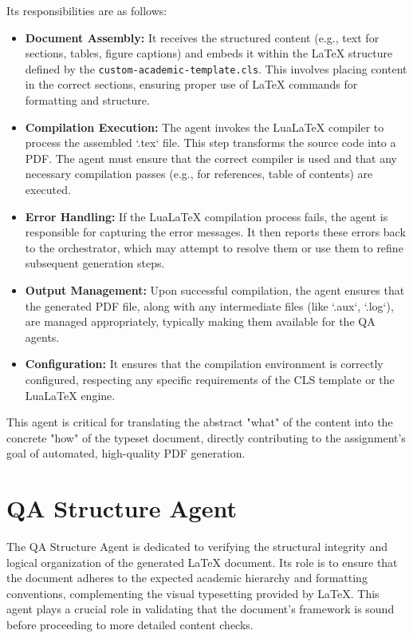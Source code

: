 \documentclass{custom-academic-template}
\begin{document}
Its responsibilities are as follows:
\begin{itemize}
    \item 	\textbf{Document Assembly:} It receives the structured content (e.g., text for sections, tables, figure captions) and embeds it within the LaTeX structure defined by the 	\texttt{custom-academic-template.cls}. This involves placing content in the correct sections, ensuring proper use of LaTeX commands for formatting and structure.
    \item 	\textbf{Compilation Execution:} The agent invokes the LuaLaTeX compiler to process the assembled `.tex` file. This step transforms the source code into a PDF. The agent must ensure that the correct compiler is used and that any necessary compilation passes (e.g., for references, table of contents) are executed.
    \item 	\textbf{Error Handling:} If the LuaLaTeX compilation process fails, the agent is responsible for capturing the error messages. It then reports these errors back to the orchestrator, which may attempt to resolve them or use them to refine subsequent generation steps.
    \item 	\textbf{Output Management:} Upon successful compilation, the agent ensures that the generated PDF file, along with any intermediate files (like `.aux`, `.log`), are managed appropriately, typically making them available for the QA agents.
    \item 	\textbf{Configuration:} It ensures that the compilation environment is correctly configured, respecting any specific requirements of the CLS template or the LuaLaTeX engine.
\end{itemize}
This agent is critical for translating the abstract "what" of the content into the concrete "how" of the typeset document, directly contributing to the assignment's goal of automated, high-quality PDF generation.

\section{QA Structure Agent}
The QA Structure Agent is dedicated to verifying the structural integrity and logical organization of the generated LaTeX document. Its role is to ensure that the document adheres to the expected academic hierarchy and formatting conventions, complementing the visual typesetting provided by LaTeX. This agent plays a crucial role in validating that the document's framework is sound before proceeding to more detailed content checks.
\end{document}
